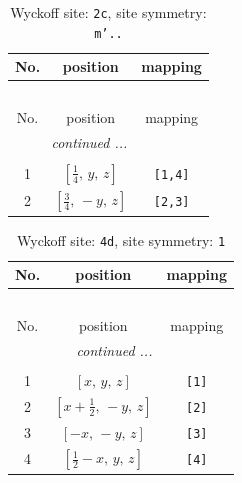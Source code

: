 \documentclass[fleqn,8pt]{jsarticle}
\begin{document}
\begin{longtable}{ccc}
\caption{Wyckoff site: {\tt 2c}, site symmetry: {\tt m'..}}
 \\
 \hline \hline
No. & position & mapping \\ \hline \endfirsthead

\multicolumn{2}{l}{\tablename\ \thetable{}} \\
 \hline \hline
No. & position & mapping \\ \hline \endhead

 \hline \hline
\multicolumn{2}{r}{\footnotesize\it continued ...} \\ \endfoot

 \hline \hline
\multicolumn{2}{r}{} \\ \endlastfoot

1 & $\left[ \frac{1}{4},\, y,\, z \right]$ & {\tt [1,4]} \\ \hline
2 & $\left[ \frac{3}{4},\, - y,\, z \right]$ & {\tt [2,3]} \\
\end{longtable}
\renewcommand{\arraystretch}{1.2}
\begin{longtable}{ccc}
\caption{Wyckoff site: {\tt 4d}, site symmetry: {\tt 1}}
 \\
 \hline \hline
No. & position & mapping \\ \hline \endfirsthead

\multicolumn{2}{l}{\tablename\ \thetable{}} \\
 \hline \hline
No. & position & mapping \\ \hline \endhead

 \hline \hline
\multicolumn{2}{r}{\footnotesize\it continued ...} \\ \endfoot

 \hline \hline
\multicolumn{2}{r}{} \\ \endlastfoot

1 & $\left[ x,\, y,\, z \right]$ & {\tt [1]} \\ \hline
2 & $\left[ x + \frac{1}{2},\, - y,\, z \right]$ & {\tt [2]} \\ \hline
3 & $\left[ - x,\, - y,\, z \right]$ & {\tt [3]} \\ \hline
4 & $\left[ \frac{1}{2} - x,\, y,\, z \right]$ & {\tt [4]} \\
\end{longtable}
\end{document}
